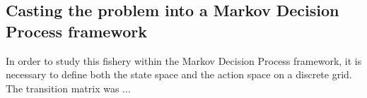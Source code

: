 \subsection{Casting the problem into a Markov Decision Process framework}

In order to study this fishery within the Markov Decision Process framework, it is necessary to define both the state space and the action space on a discrete grid.\\

The transition matrix was ...
